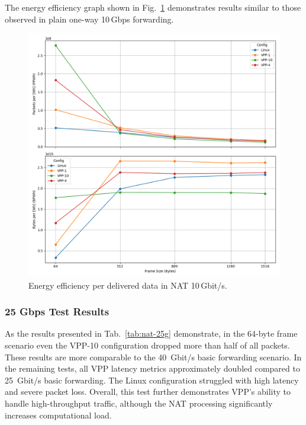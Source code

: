 The energy efficiency graph shown in Fig.~\ref{fig:nat-10g} demonstrates results similar to those observed in plain one-way 10\,Gbps forwarding.

\begin{figure}[!htbp]
    \centering
    \includegraphics[width=\linewidth]{images/consumption-nat-10g.png}
    \caption{Energy efficiency per delivered data in NAT 10\,Gbit/s.}
    \label{fig:nat-10g}
\end{figure}

\subsubsection{25 Gbps Test Results}

As the results presented in Tab.~\ref{tab:nat-25g} demonstrate, in the 64-byte frame scenario even the VPP-10 configuration dropped more than half of all packets. 
These results are more comparable to the 40~Gbit/s basic forwarding scenario.
In the remaining tests, all VPP latency metrics approximately doubled compared to 25~Gbit/s basic forwarding. The Linux configuration struggled with high latency and severe packet loss.
Overall, this test further demonstrates VPP's ability to handle high-throughput traffic, although the NAT processing significantly increases computational load.

